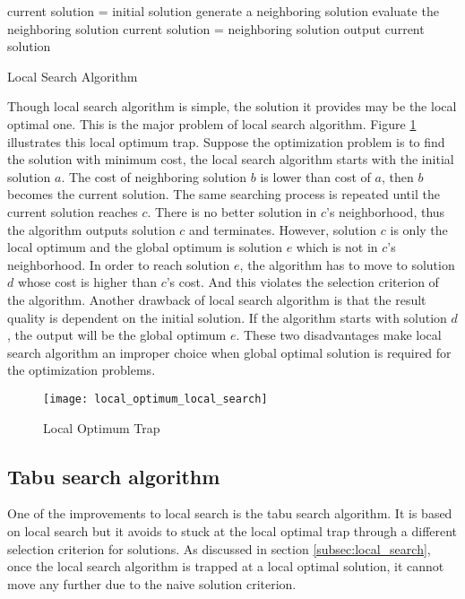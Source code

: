 			\begin{algorithm2e}[H]
				current solution = initial solution\;
				{
					generate a neighboring solution\;
					evaluate the neighboring solution\;
					{
						current solution = neighboring solution\;
					}
				}
				output current solution\;
				\caption{Local Search Algorithm}
				\label{algo:local_search}
			\end{algorithm2e}
		
		Though local search algorithm is simple, the solution it provides may be the local optimal one. This is the major problem of
		local search algorithm. Figure \ref{fig:local_optimum_local_search} illustrates this local optimum trap. Suppose the
		optimization problem is to find the solution with minimum cost, the local search algorithm starts with the initial solution $a$.
		The cost of neighboring solution $b$ is lower than cost of $a$, then $b$ becomes the current solution. The same searching process 
		is repeated until the current solution reaches $c$. There is no better solution in $c$'s neighborhood, thus the algorithm outputs solution $c$ and terminates. However, solution $c$ is only the local optimum and the global optimum is solution $e$ which
		is not in $c$'s neighborhood. In order to reach solution $e$, the algorithm has to move to solution $d$ whose cost is higher than
		$c$'s cost. And this violates the selection criterion of the algorithm. Another drawback of local search algorithm is that the result quality is dependent on the initial solution. If the algorithm starts with solution $d$, the output will be the global optimum $e$. These two disadvantages make local search algorithm an improper choice when global optimal solution is required for 
		the optimization problems.
		
			\begin{figure}[H]
				\begin{center}
					\texttt{[image: local\_optimum\_local\_search]}
					\caption[Local Optimum Problem]{Local Optimum Trap}
					\label{fig:local_optimum_local_search}
				\end{center}
			\end{figure}
		
		\subsection{Tabu search algorithm}
		\label{subsec:tabu_search}
		One of the improvements to local search is the tabu search algorithm. It is based on local search but it avoids to stuck at the
		local optimal trap through a different selection criterion for solutions. As discussed in section \ref{subsec:local_search}, once
		the local search algorithm is trapped at a local optimal solution, it cannot move any further due to the naive solution criterion.
		
		
		
		
		
		
		
		
		
		
		
		
		